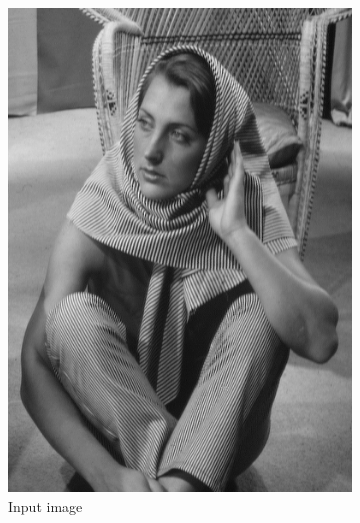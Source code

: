 \documentclass[a4paper]{article}
\begin{document}
\begin{figure}[h!]
        \centering
        \begin{subfigure}[b]{0.3\textwidth}
                \centering
                \includegraphics[width=\textwidth]{q4-orig.png}
                \caption{Input image}
                \label{fig:be}
        \end{subfigure}
        \begin{subfigure}[b]{0.3\textwidth}
                \centering

\end{subfigure}
\end{figure}
\end{document}
